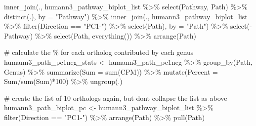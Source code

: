 \documentclass[
  letterpaper,
]{book}
\newenvironment{Shaded}{}{}
\newcommand{\AttributeTok}[1]{\textcolor[rgb]{0.84,0.23,0.29}{#1}}
\newcommand{\CommentTok}[1]{\textcolor[rgb]{0.42,0.45,0.49}{#1}}
\newcommand{\DecValTok}[1]{\textcolor[rgb]{0.00,0.36,0.77}{#1}}
\newcommand{\FunctionTok}[1]{\textcolor[rgb]{0.44,0.26,0.76}{#1}}
\newcommand{\NormalTok}[1]{\textcolor[rgb]{0.14,0.16,0.18}{#1}}
\newcommand{\OtherTok}[1]{\textcolor[rgb]{0.44,0.26,0.76}{#1}}
\newcommand{\SpecialCharTok}[1]{\textcolor[rgb]{0.00,0.36,0.77}{#1}}
\newcommand{\StringTok}[1]{\textcolor[rgb]{0.01,0.18,0.38}{#1}}
\begin{document}
\begin{Shaded}
\begin{Highlighting}[]
  \FunctionTok{inner\_join}\NormalTok{(., humann3\_pathway\_biplot\_list }\SpecialCharTok{\%\textgreater{}\%}
              \FunctionTok{select}\NormalTok{(Pathway, Path) }\SpecialCharTok{\%\textgreater{}\%}
               \FunctionTok{distinct}\NormalTok{(.), }\AttributeTok{by =} \StringTok{"Pathway"}\NormalTok{) }\SpecialCharTok{\%\textgreater{}\%}
  \FunctionTok{inner\_join}\NormalTok{(.,  humann3\_pathway\_biplot\_list }\SpecialCharTok{\%\textgreater{}\%}
               \FunctionTok{filter}\NormalTok{(Direction }\SpecialCharTok{==} \StringTok{"PC1{-}"}\NormalTok{) }\SpecialCharTok{\%\textgreater{}\%}
               \FunctionTok{select}\NormalTok{(Path), }\AttributeTok{by =} \StringTok{"Path"}\NormalTok{) }\SpecialCharTok{\%\textgreater{}\%}
  \FunctionTok{select}\NormalTok{(}\SpecialCharTok{{-}}\NormalTok{Pathway) }\SpecialCharTok{\%\textgreater{}\%}
  \FunctionTok{select}\NormalTok{(Path, }\FunctionTok{everything}\NormalTok{()) }\SpecialCharTok{\%\textgreater{}\%}
  \FunctionTok{arrange}\NormalTok{(Path)}

\CommentTok{\# calculate the \% for each ortholog contributed by each genus}
\NormalTok{humann3\_path\_pc1neg\_stats }\OtherTok{\textless{}{-}}\NormalTok{ humann3\_path\_pc1neg }\SpecialCharTok{\%\textgreater{}\%}
  \FunctionTok{group\_by}\NormalTok{(Path, Genus) }\SpecialCharTok{\%\textgreater{}\%}
  \FunctionTok{summarize}\NormalTok{(}\AttributeTok{Sum =} \FunctionTok{sum}\NormalTok{(CPM)) }\SpecialCharTok{\%\textgreater{}\%}
  \FunctionTok{mutate}\NormalTok{(}\AttributeTok{Percent =}\NormalTok{ Sum}\SpecialCharTok{/}\FunctionTok{sum}\NormalTok{(Sum)}\SpecialCharTok{*}\DecValTok{100}\NormalTok{) }\SpecialCharTok{\%\textgreater{}\%}
  \FunctionTok{ungroup}\NormalTok{(.)}

\CommentTok{\# create the list of 10 orthologs again, but don\textquotesingle{}t collapse the list as above}
\NormalTok{humann3\_path\_biplot\_pc }\OtherTok{\textless{}{-}}\NormalTok{ humann3\_pathway\_biplot\_list }\SpecialCharTok{\%\textgreater{}\%}
  \FunctionTok{filter}\NormalTok{(Direction }\SpecialCharTok{==} \StringTok{"PC1{-}"}\NormalTok{) }\SpecialCharTok{\%\textgreater{}\%}
  \FunctionTok{arrange}\NormalTok{(Path) }\SpecialCharTok{\%\textgreater{}\%}
  \FunctionTok{pull}\NormalTok{(Path)}


\end{Highlighting}
\end{Shaded}
\end{document}
